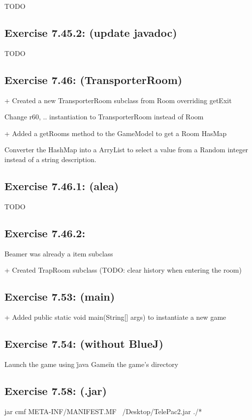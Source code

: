 \documentclass[twoside,french]{report}
\begin{document}
TODO

\subsection*{Exercise 7.45.2: (update javadoc)}

TODO

\subsection*{Exercise 7.46: (TransporterRoom)}

+ Created a new TransporterRoom subclass from Room overriding getExit

Change r60, .. instantiation to TransporterRoom instead of Room

+ Added a getRooms method to the GameModel to get a Room HasMap

Converter the HashMap into a ArryList to select a value from a Random integer instead of a string description.

\subsection*{Exercise 7.46.1: (alea)}

TODO

\subsection*{Exercise 7.46.2:}

Beamer was already a item subclass

+ Created TrapRoom subclass (TODO: clear history when entering the room)

\subsection*{Exercise 7.53: (main)}

+ Added public static void main(String[] args) to instantiate a new game

\subsection*{Exercise 7.54: (without BlueJ)}

Launch the game using \"java Game\" in the game's directory

\subsection*{Exercise 7.58: (.jar)}
jar cmf META-INF/MANIFEST.MF ~/Desktop/TelePac2.jar ./*
\end{document}
